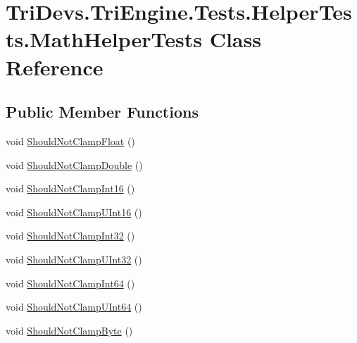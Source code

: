 \hypertarget{class_tri_devs_1_1_tri_engine_1_1_tests_1_1_helper_tests_1_1_math_helper_tests}{\section{Tri\-Devs.\-Tri\-Engine.\-Tests.\-Helper\-Tests.\-Math\-Helper\-Tests Class Reference}
\label{class_tri_devs_1_1_tri_engine_1_1_tests_1_1_helper_tests_1_1_math_helper_tests}
}
\subsection*{Public Member Functions}
\begin{DoxyCompactItemize}
\item 
void \hyperlink{class_tri_devs_1_1_tri_engine_1_1_tests_1_1_helper_tests_1_1_math_helper_tests_a3b0c4346720dc9c1f58791ea2ced001b}{Should\-Not\-Clamp\-Float} ()
\item 
void \hyperlink{class_tri_devs_1_1_tri_engine_1_1_tests_1_1_helper_tests_1_1_math_helper_tests_a56214140e92b15e7292a2d6db07fa73e}{Should\-Not\-Clamp\-Double} ()
\item 
void \hyperlink{class_tri_devs_1_1_tri_engine_1_1_tests_1_1_helper_tests_1_1_math_helper_tests_ab4b71edca0494a031e70767398f8918c}{Should\-Not\-Clamp\-Int16} ()
\item 
void \hyperlink{class_tri_devs_1_1_tri_engine_1_1_tests_1_1_helper_tests_1_1_math_helper_tests_a9c3239e4e1d3447560d279b5e56ed4ae}{Should\-Not\-Clamp\-U\-Int16} ()
\item 
void \hyperlink{class_tri_devs_1_1_tri_engine_1_1_tests_1_1_helper_tests_1_1_math_helper_tests_aca6fecca2c26aa01bfdf3744d2479f99}{Should\-Not\-Clamp\-Int32} ()
\item 
void \hyperlink{class_tri_devs_1_1_tri_engine_1_1_tests_1_1_helper_tests_1_1_math_helper_tests_af2e048600dfd1d97b0c34975c747ee0f}{Should\-Not\-Clamp\-U\-Int32} ()
\item 
void \hyperlink{class_tri_devs_1_1_tri_engine_1_1_tests_1_1_helper_tests_1_1_math_helper_tests_a83fa09c71374a9bcdc70523389e459a2}{Should\-Not\-Clamp\-Int64} ()
\item 
void \hyperlink{class_tri_devs_1_1_tri_engine_1_1_tests_1_1_helper_tests_1_1_math_helper_tests_ae773b2568658e69962b3dbd2e938716f}{Should\-Not\-Clamp\-U\-Int64} ()
\item 
void \hyperlink{class_tri_devs_1_1_tri_engine_1_1_tests_1_1_helper_tests_1_1_math_helper_tests_a71d04dc605de2227b740329d01a24598}{Should\-Not\-Clamp\-Byte} ()

\end{DoxyCompactItemize}
